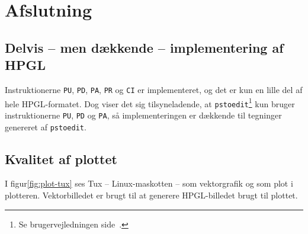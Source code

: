 \chapter{Afslutning}
\label{ch:afslutning}





\section{Delvis -- men dækkende -- implementering af HPGL}

Instruktionerne \texttt{PU}, \texttt{PD}, \texttt{PA}, \texttt{PR} og
\texttt{CI} er implementeret, og det er kun en lille del af hele
HPGL-formatet. Dog viser det sig tilsyneladende, at
\texttt{pstoedit}\footnote{Se brugervejledningen
  side~\pageref{ch:brugervejledning}.} kun bruger instruktionerne
\texttt{PU}, \texttt{PD} og \texttt{PA}, så implementeringen er
dækkende til tegninger genereret af \texttt{pstoedit}.


\section{Kvalitet af plottet}

I figur\vref{fig:plot-tux} ses Tux -- Linux-maskotten -- som
vektorgrafik og som plot i plotteren. Vektorbilledet er brugt til at
generere HPGL-billedet brugt til plottet.


